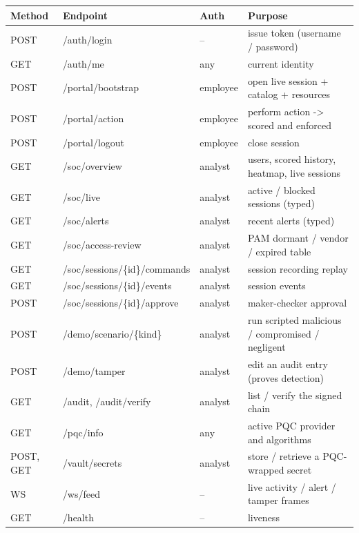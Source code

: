 \documentclass[
]{article}
\newcounter{none} %
\begin{document}
{\def\LTcaptype{none} %
\begin{longtable}[]{@{}
  >{\raggedright\arraybackslash}p{}
  >{\raggedright\arraybackslash}p{}
  >{\raggedright\arraybackslash}p{}
  >{\raggedright\arraybackslash}p{}@{}}
\toprule\noalign{}
\begin{minipage}[b]{\linewidth}\raggedright
Method
\end{minipage} & \begin{minipage}[b]{\linewidth}\raggedright
Endpoint
\end{minipage} & \begin{minipage}[b]{\linewidth}\raggedright
Auth
\end{minipage} & \begin{minipage}[b]{\linewidth}\raggedright
Purpose
\end{minipage} \\
\midrule\noalign{}
\endhead
\bottomrule\noalign{}
\endlastfoot
POST & /auth/login & -- & issue token (username / password) \\
GET & /auth/me & any & current identity \\
POST & /portal/bootstrap & employee & open live session + catalog +
resources \\
POST & /portal/action & employee & perform action -\textgreater{} scored
and enforced \\
POST & /portal/logout & employee & close session \\
GET & /soc/overview & analyst & users, scored history, heatmap, live
sessions \\
GET & /soc/live & analyst & active / blocked sessions (typed) \\
GET & /soc/alerts & analyst & recent alerts (typed) \\
GET & /soc/access-review & analyst & PAM dormant / vendor / expired
table \\
GET & /soc/sessions/\{id\}/commands & analyst & session recording
replay \\
GET & /soc/sessions/\{id\}/events & analyst & session events \\
POST & /soc/sessions/\{id\}/approve & analyst & maker-checker
approval \\
POST & /demo/scenario/\{kind\} & analyst & run scripted malicious /
compromised / negligent \\
POST & /demo/tamper & analyst & edit an audit entry (proves
detection) \\
GET & /audit, /audit/verify & analyst & list / verify the signed
chain \\
GET & /pqc/info & any & active PQC provider and algorithms \\
POST, GET & /vault/secrets & analyst & store / retrieve a PQC-wrapped
secret \\
WS & /ws/feed & -- & live activity / alert / tamper frames \\
GET & /health & -- & liveness \\
\end{longtable}
}
\end{document}
